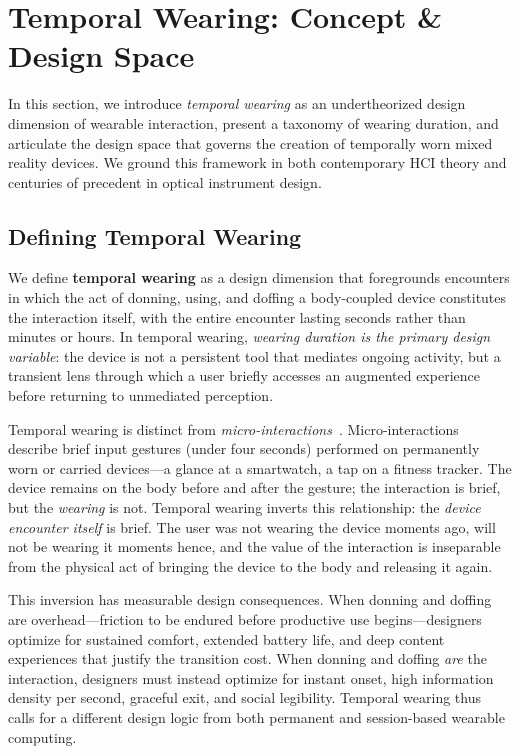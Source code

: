 
\section{Temporal Wearing: Concept \& Design Space}

In this section, we introduce \textit{temporal wearing} as an undertheorized design dimension of wearable interaction, present a taxonomy of wearing duration, and articulate the design space that governs the creation of temporally worn mixed reality devices. We ground this framework in both contemporary HCI theory and centuries of precedent in optical instrument design.

\subsection{Defining Temporal Wearing}

We define \textbf{temporal wearing} as a design dimension that foregrounds encounters in which the act of donning, using, and doffing a body-coupled device constitutes the interaction itself, with the entire encounter lasting seconds rather than minutes or hours. In temporal wearing, \textit{wearing duration is the primary design variable}: the device is not a persistent tool that mediates ongoing activity, but a transient lens through which a user briefly accesses an augmented experience before returning to unmediated perception.

Temporal wearing is distinct from \textit{micro-interactions}~\cite{ashbrook2010microinteractions}. Micro-interactions describe brief input gestures (under four seconds) performed on permanently worn or carried devices---a glance at a smartwatch, a tap on a fitness tracker. The device remains on the body before and after the gesture; the interaction is brief, but the \textit{wearing} is not. Temporal wearing inverts this relationship: the \textit{device encounter itself} is brief. The user was not wearing the device moments ago, will not be wearing it moments hence, and the value of the interaction is inseparable from the physical act of bringing the device to the body and releasing it again.

This inversion has measurable design consequences. When donning and doffing are overhead---friction to be endured before productive use begins---designers optimize for sustained comfort, extended battery life, and deep content experiences that justify the transition cost. When donning and doffing \textit{are} the interaction, designers must instead optimize for instant onset, high information density per second, graceful exit, and social legibility. Temporal wearing thus calls for a different design logic from both permanent and session-based wearable computing.

